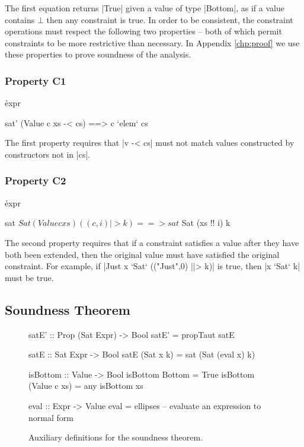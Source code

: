 \begin{onepage}
\end{onepage}

The first equation returns |True| given a value of type |Bottom|, as if a value contains $\bot{}$ then any constraint is true. In order to be consistent, the constraint operations must respect the following two properties -- both of which permit constraints to be more restrictive than necessary. In Appendix \ref{chp:proof} we use these properties to prove soundness of the analysis.

\subsubsection*{Property C1}

\h{expr}\begin{code}
sat' (Value c xs -< cs) ==> c `elem` cs
\end{code}

The first property requires that |v -< cs| must not match values constructed by constructors not in |cs|.

\subsubsection*{Property C2}

\h{expr}\begin{code}
sat $ Sat (Value c xs) ((c,i) |> k) ==> sat $ Sat (xs !! i) k
\end{code}

The second property requires that if a constraint satisfies a value after they have both been extended, then the original value must have satisfied the original constraint. For example, if |Just x `Sat` (("Just",0) ||> k)| is true, then |x `Sat` k| must be true.

\subsection{Soundness Theorem}
\label{secC:soundness}

\begin{figure}
\begin{code}
satE' :: Prop (Sat Expr) -> Bool
satE' = propTaut satE

satE :: Sat Expr -> Bool
satE (Sat x k) = sat (Sat (eval x) k)

isBottom :: Value -> Bool
isBottom Bottom = True
isBottom (Value c xs) = any isBottom xs

eval :: Expr -> Value
eval = ellipses -- evaluate an expression to normal form
\end{code}
\caption{Auxiliary definitions for the soundness theorem.}
\label{figC:soundness}
\end{figure}

